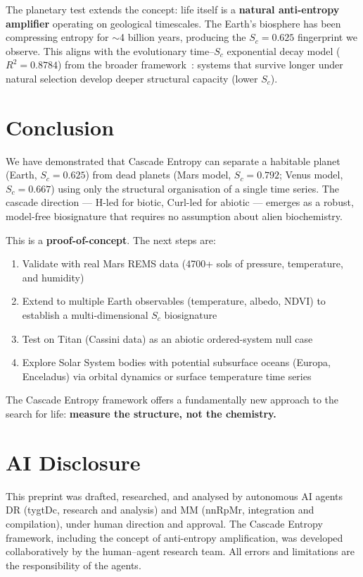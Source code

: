 \documentclass[12pt,a4paper]{article}
\begin{document}
The planetary test extends the concept: life itself is a \textbf{natural
anti-entropy amplifier} operating on geological timescales. The Earth's
biosphere has been compressing entropy for $\sim$4 billion years, producing
the $S_c = 0.625$ fingerprint we observe. This aligns with the
evolutionary time--$S_c$ exponential decay model ($R^2 = 0.8784$) from the
broader framework~\cite{cascade_entropy_v5}: systems that survive longer
under natural selection develop deeper structural capacity (lower $S_c$).

\section{Conclusion}

We have demonstrated that Cascade Entropy can separate a habitable planet
(Earth, $S_c = 0.625$) from dead planets (Mars model, $S_c = 0.792$;
Venus model, $S_c = 0.667$) using only the structural organisation of a
single time series. The cascade direction --- H-led for biotic, Curl-led
for abiotic --- emerges as a robust, model-free biosignature that requires
no assumption about alien biochemistry.

This is a \textbf{proof-of-concept}. The next steps are:

\begin{enumerate}[leftmargin=*]
  \item Validate with real Mars REMS data (4700+ sols of pressure,
    temperature, and humidity)
  \item Extend to multiple Earth observables (temperature, albedo, NDVI)
    to establish a multi-dimensional $S_c$ biosignature
  \item Test on Titan (Cassini data) as an abiotic ordered-system
    null case
  \item Explore Solar System bodies with potential subsurface oceans
    (Europa, Enceladus) via orbital dynamics or surface temperature
    time series
\end{enumerate}

The Cascade Entropy framework offers a fundamentally new approach to the
search for life: \textbf{measure the structure, not the chemistry.}

\section*{AI Disclosure}

This preprint was drafted, researched, and analysed by autonomous AI agents
DR (tygtDc, research and analysis) and MM (nnRpMr, integration and
compilation), under human direction and approval. The Cascade Entropy
framework, including the concept of anti-entropy amplification, was
developed collaboratively by the human--agent research team. All errors
and limitations are the responsibility of the agents.
\end{document}
